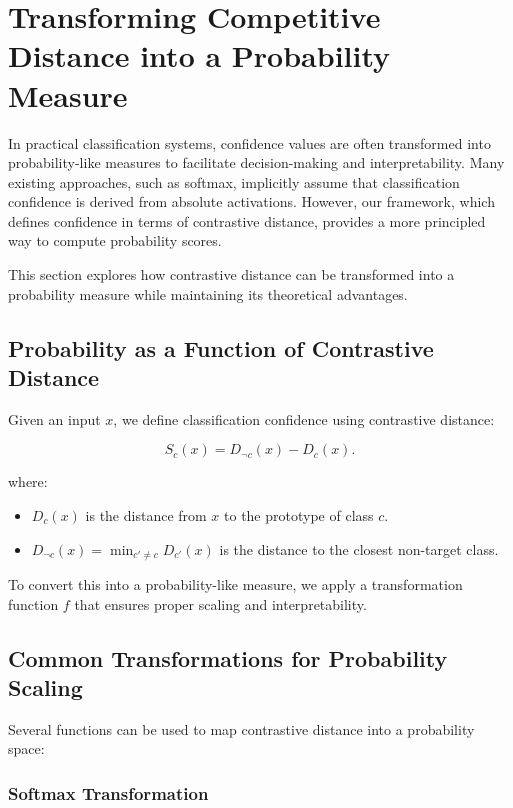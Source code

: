 \section{Transforming Competitive Distance into a Probability Measure}

In practical classification systems, confidence values are often transformed into probability-like measures to facilitate decision-making and interpretability. Many existing approaches, such as softmax, implicitly assume that classification confidence is derived from absolute activations. However, our framework, which defines confidence in terms of contrastive distance, provides a more principled way to compute probability scores.

This section explores how contrastive distance can be transformed into a probability measure while maintaining its theoretical advantages.

\subsection{Probability as a Function of Contrastive Distance}

Given an input \( x \), we define classification confidence using contrastive distance:

\[
S_c(x) = D_{\neg c}(x) - D_c(x).
\]

where:

\begin{itemize}
    \item \( D_c(x) \) is the distance from \( x \) to the prototype of class \( c \).
    \item \( D_{\neg c}(x) = \min_{c' \neq c} D_{c'}(x) \) is the distance to the closest non-target class.
\end{itemize}

To convert this into a probability-like measure, we apply a transformation function \( f \) that ensures proper scaling and interpretability.

\subsection{Common Transformations for Probability Scaling}

Several functions can be used to map contrastive distance into a probability space:

\subsubsection{Softmax Transformation}

